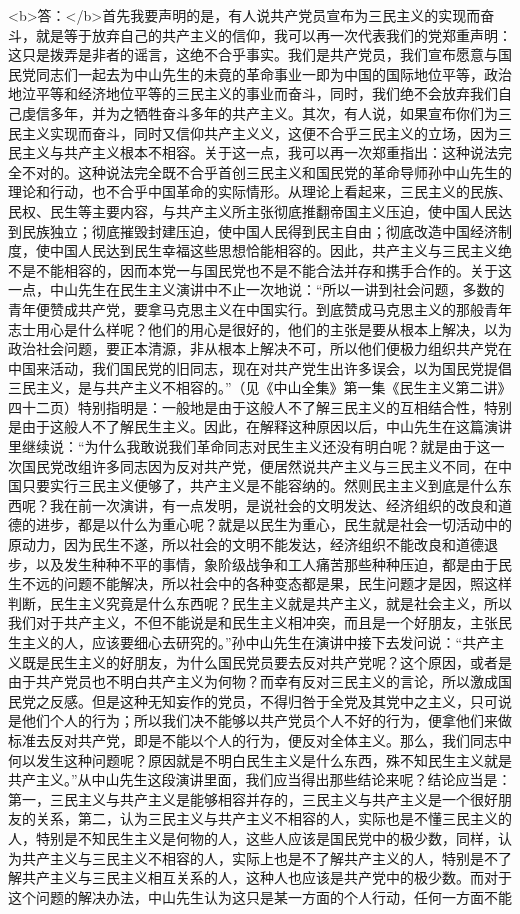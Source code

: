 <b>答：</b>首先我要声明的是，有人说共产党员宣布为三民主义的实现而奋斗，就是等于放弃自己的共产主义的信仰，我可以再一次代表我们的党郑重声明：这只是拨弄是非者的谣言，这绝不合乎事实。我们是共产党员，我们宣布愿意与国民党同志们一起去为中山先生的未竟的革命事业一即为中国的国际地位平等，政治地泣平等和经济地位平等的三民主义的事业而奋斗，同时，我们绝不会放弃我们自己虔信多年，并为之牺牲奋斗多年的共产主义。其次，有人说，如果宣布你们为三民主义实现而奋斗，同时又信仰共产主义义，这便不合乎三民主义的立场，因为三民主义与共产主义根本不相容。关于这一点，我可以再一次郑重指出：这种说法完全不对的。这种说法完全既不合乎首创三民主义和国民党的革命导师孙中山先生的理论和行动，也不合乎中国革命的实际情形。从理论上看起来，三民主义的民族、民权、民生等主要内容，与共产主义所主张彻底推翻帝国主义压迫，使中国人民达到民族独立；彻底摧毁封建压迫，使中国人民得到民主自由；彻底改造中国经济制度，使中国人民达到民生幸福这些思想恰能相容的。因此，共产主义与三民主义绝不是不能相容的，因而本党一与国民党也不是不能合法并存和携手合作的。关于这一点，中山先生在民生主义演讲中不止一次地说：“所以一讲到社会问题，多数的青年便赞成共产党，要拿马克思主义在中国实行。到底赞成马克思主义的那般青年志士用心是什么样呢？他们的用心是很好的，他们的主张是要从根本上解决，以为政治社会问题，要正本清源，非从根本上解决不可，所以他们便极力组织共产党在中国来活动，我们国民党的旧同志，现在对共产党生出许多误会，以为国民党提倡三民主义，是与共产主义不相容的。”（见《中山全集》第一集《民生主义第二讲》四十二页）特别指明是：一般地是由于这般人不了解三民主义的互相结合性，特别是由于这般人不了解民生主义。因此，在解释这种原因以后，中山先生在这篇演讲里继续说：“为什么我敢说我们革命同志对民生主义还没有明白呢？就是由于这一次国民党改组许多同志因为反对共产党，便居然说共产主义与三民主义不同，在中国只要实行三民主义便够了，共产主义是不能容纳的。然则民主主义到底是什么东西呢？我在前一次演讲，有一点发明，是说社会的文明发达、经济组织的改良和道德的进步，都是以什么为重心呢？就是以民生为重心，民生就是社会一切活动中的原动力，因为民生不遂，所以社会的文明不能发达，经济组织不能改良和道德退步，以及发生种种不平的事情，象阶级战争和工人痛苦那些种种压迫，都是由于民生不远的问题不能解决，所以社会中的各种变态都是果，民生问题才是因，照这样判断，民生主义究竟是什么东西呢？民生主义就是共产主义，就是社会主义，所以我们对于共产主义，不但不能说是和民生主义相冲突，而且是一个好朋友，主张民生主义的人，应该要细心去研究的。”孙中山先生在演讲中接下去发问说：“共产主义既是民生主义的好朋友，为什么国民党员要去反对共产党呢？这个原因，或者是由于共产党员也不明白共产主义为何物？而幸有反对三民主义的言论，所以激成国民党之反感。但是这种无知妄作的党员，不得归咎于全党及其党中之主义，只可说是他们个人的行为；所以我们决不能够以共产党员个人不好的行为，便拿他们来做标准去反对共产党，即是不能以个人的行为，便反对全体主义。那么，我们同志中何以发生这种问题呢？原因就是不明白民生主义是什么东西，殊不知民生主义就是共产主义。”从中山先生这段演讲里面，我们应当得出那些结论来呢？结论应当是：第一，三民主义与共产主义是能够相容并存的，三民主义与共产主义是一个很好朋友的关系，第二，认为三民主义与共产主义不相容的人，实际也是不懂三民主义的人，特别是不知民生主义是何物的人，这些人应该是国民党中的极少数，同样，认为共产主义与三民主义不相容的人，实际上也是不了解共产主义的人，特别是不了解共产主义与三民主义相互关系的人，这种人也应该是共产党中的极少数。而对于这个问题的解决办法，中山先生认为这只是某一方面的个人行动，任何一方面不能